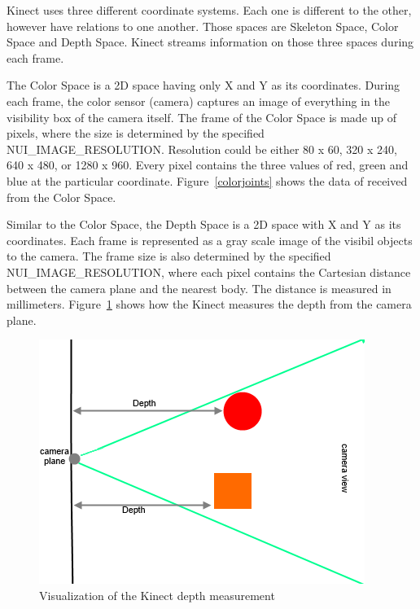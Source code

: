 Kinect uses three different coordinate systems. Each one is different to the other, however have relations to one another. Those spaces are Skeleton Space, Color Space and Depth Space. Kinect streams information on those three spaces during each frame.

The Color Space is a 2D space having only X and Y as its coordinates. During each frame, the color sensor (camera) captures an image of everything in the visibility box of the camera itself. The frame of the Color Space is made up of pixels, where the size is determined by the specified NUI\_IMAGE\_RESOLUTION. Resolution could be either 80 x 60, 320 x 240, 640 x 480, or 1280 x 960. Every pixel contains the three values of red, green and blue at the particular coordinate. Figure~\ref{colorjoints} shows the data of received from the Color Space.

Similar to the Color Space, the Depth Space is a 2D space with X and Y as its coordinates. Each frame is represented as a gray scale image of the visibil objects to the camera. The frame size is also determined by the specified NUI\_IMAGE\_RESOLUTION, where each pixel contains the Cartesian distance between the camera plane and the nearest body. The distance is measured in millimeters. Figure~\ref{depthspace} shows how the Kinect measures the depth from the camera plane.

\begin{figure}[!htbp]
\centering
\includegraphics{images/depthspace.png}
\caption{Visualization of the Kinect depth measurement}
\label{depthspace}
\end{figure}

